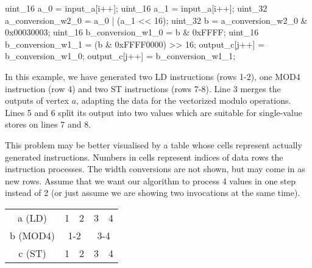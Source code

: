 
\mybeginfig
\begin{code}
uint_16 a_0 = input_a[i++];
uint_16 a_1 = input_a[i++];
uint_32 a_conversion_w2_0 = a_0 | (a_1 << 16);
uint_32 b = a_conversion_w2_0 & 0x00030003;
uint_16 b_conversion_w1_0 = b & 0xFFFF;
uint_16 b_conversion_w1_1 = (b & 0xFFFF0000) >> 16;
output_c[j++] = b_conversion_w1_0;
output_c[j++] = b_conversion_w1_1;
\end{code}

In this example, we have generated two LD instructions (rows 1-2), one MOD4 instruction (row 4) and two ST instructions (rows 7-8). Line 3 merges the outputs of vertex $a$, adapting the data for the vectorized modulo operations. Lines 5 and 6 split its output into two values which are suitable for single-value stores on lines 7 and 8.


This problem may be better visualised by a table whose cells represent actually generated instructions. Numbers in cells represent indices of data rows the instruction processes. The width conversions are not shown, but may come in as new rows. Assume that we want our algorithm to process 4 values in one step instead of 2 (or just assume we are showing two invocations at the same time).

\mybeginfig
\begin{center}
\begin{tabular}{c|c|c|c|c|}
  \cline{2-5}
a (LD) & 1 & 2 & 3 & 4\\
  \cline{2-5}
b (MOD4) & \multicolumn{2}{c|}{1-2} & \multicolumn{2}{c|}{3-4}\\
  \cline{2-5}
c (ST) & 1 & 2 & 3 & 4\\
  \cline{2-5}
\end{tabular}
\end{center}

